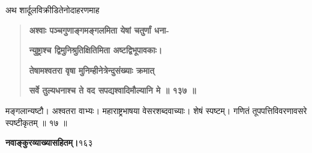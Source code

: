 \documentclass[11pt, openany]{book}
\begin{document}
\begin{sloppypar}
\hangindent=0.2in \hspace{0.2in}अथ शार्दूलविक्रीडितेनोदाहरणमाह\textendash

\begin{quote}
\hspace{1in}\textbf{अश्वाः पञ्चगुणाङ्गमङ्गलमिता येषां चतुर्णां धना-}

\hspace{1in}\textbf{न्युष्ट्राश्च द्विमुनिश्रुतिक्षितिमिता अष्टद्विभूपावकाः।}

\hspace{1in}\textbf{तेषामश्वतरा वृषा मुनिम्हीनेत्रेन्दुसंख्याः क्रमात्}

\hspace{1in}\textbf{सर्वे तुल्यधनाश्च ते वद सपद्यश्वादिमौल्यानि मे ॥ १३७ ॥}
\end{quote}

\hangindent=0.2in \hspace{0.2in}मङ्गलान्यष्टौ। अश्वतरा वाभ्यः। महाराष्ट्रभाषया वेसरशब्दवाच्याः। शेषं स्पष्टम्। गणितं तूपपत्तिविवरणावसरे स्पष्टीकृतम् ॥ १७ ॥
\end{sloppypar}
\thispagestyle{empty}
\newpage

\onehalfspacing
\hspace{2in}\textbf{नवाङ्कुरव्याख्यासहितम्।}\hspace{2in}१६३

\vspace{5mm}
\end{document}
